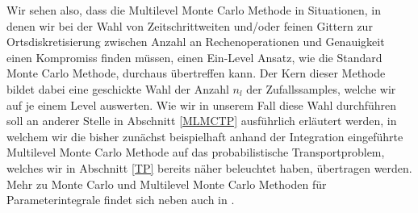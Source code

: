 Wir sehen also, dass die Multilevel Monte Carlo Methode in Situationen, in denen wir bei der Wahl von Zeitschrittweiten und/oder feinen Gittern zur Ortsdiskretisierung zwischen Anzahl an Rechenoperationen und Genauigkeit einen Kompromiss finden müssen, einen Ein-Level Ansatz, wie die Standard Monte Carlo Methode, durchaus übertreffen kann.
Der Kern dieser Methode bildet dabei eine geschickte Wahl der Anzahl $ n_l $ der Zufallssamples, welche wir auf je einem Level auswerten. Wie wir in unserem Fall diese Wahl durchführen soll an anderer Stelle in Abschnitt \ref{MLMCTP} ausführlich erläutert werden, in welchem wir die bisher zunächst beispielhaft anhand der Integration eingeführte Multilevel Monte Carlo Methode auf das probabilistische Transportproblem, welches wir in Abschnitt \ref{TP} bereits näher beleuchtet haben, übertragen werden.
Mehr zu Monte Carlo und Multilevel Monte Carlo Methoden für Parameterintegrale findet sich neben \cite{heinrich2001multilevel} auch in \cite{heinrich1992random}.

